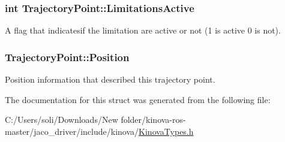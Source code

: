 \subsubsection[{\texorpdfstring{Limitations\+Active}{LimitationsActive}}]{\setlength{\rightskip}{0pt plus 5cm}int Trajectory\+Point\+::\+Limitations\+Active}\hypertarget{struct_trajectory_point_acec47b76503d6f202e78bd00ec8fa02d}{}\label{struct_trajectory_point_acec47b76503d6f202e78bd00ec8fa02d}


A flag that indicatesif the limitation are active or not (1 is active 0 is not). 

\subsubsection[{\texorpdfstring{Position}{Position}}]{ Trajectory\+Point\+::\+Position}\hypertarget{struct_trajectory_point_aa24430dc273e9d7968a6c44e3bcee259}{}\label{struct_trajectory_point_aa24430dc273e9d7968a6c44e3bcee259}


Position information that described this trajectory point. 



The documentation for this struct was generated from the following file\+:\begin{DoxyCompactItemize}
\item 
C\+:/\+Users/soli/\+Downloads/\+New folder/kinova-\/ros-\/master/jaco\+\_\+driver/include/kinova/\hyperlink{_kinova_types_8h}{Kinova\+Types.\+h}\end{DoxyCompactItemize}
